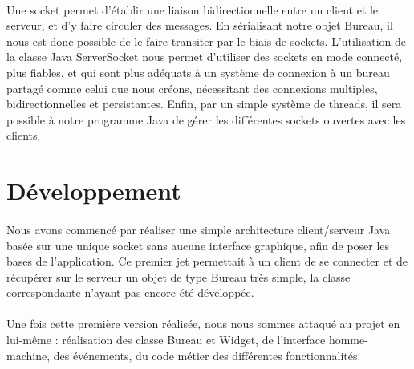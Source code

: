 \paragraph{}
Une socket permet d'établir une liaison bidirectionnelle entre un client et le serveur, et d'y faire circuler des messages. En sérialisant notre objet Bureau, il nous est donc possible de le faire transiter par le biais de sockets. L'utilisation de la classe Java ServerSocket nous permet d'utiliser des sockets en mode connecté, plus fiables, et qui sont plus adéquats à un système de connexion à un bureau partagé comme celui que nous créons, nécessitant des connexions multiples, bidirectionnelles et persistantes. Enfin, par un simple système de threads, il sera possible à notre programme Java de gérer les différentes sockets ouvertes avec les clients.

\section{Développement}

\paragraph{}
Nous avons commencé par réaliser une simple architecture client/serveur Java basée sur une unique socket sans aucune interface graphique, afin de poser les bases de l'application. Ce premier jet permettait à un client de se connecter et de récupérer sur le serveur un objet de type Bureau très simple, la classe correspondante n'ayant pas encore été développée.

\paragraph{}
Une fois cette première version réalisée, nous nous sommes attaqué au projet en lui-même : réalisation des classe Bureau et Widget, de l'interface homme-machine, des événements, du code métier des différentes fonctionnalités.


